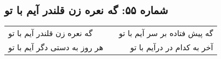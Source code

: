 \begin{center}
\section*{شماره ۵۵: گه نعره زن قلندر آیم با تو}
\label{sec:055}
\begin{longtable}{l p{0.5cm} r}
گه نعره زن قلندر آیم با تو
&&
گه پیش فتاده بر سر آیم با تو
\\
هر روز به دستی دگر آیم با تو
&&
آخر به کدام در درآیم با تو
\\
\end{longtable}
\end{center}
